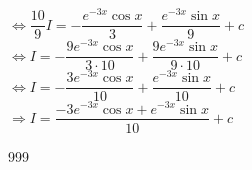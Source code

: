 \documentclass[a4paper]{article}
\begin{document}
$\Leftrightarrow \dfrac{10}{9}I = -\dfrac{e^{-3x} \cos x}{3} + \dfrac{e^{-3x} \sin x}{9} + c$ \\

$\Leftrightarrow I = -\dfrac{9e^{-3x} \cos x}{3\cdot10} + \dfrac{9e^{-3x} \sin x}{9\cdot10} + c$ \\

$\Leftrightarrow I = -\dfrac{3e^{-3x} \cos x}{10} + \dfrac{e^{-3x} \sin x}{10} + c$ \\

$\Rightarrow I = \dfrac{-3e^{-3x}\cos x + e^{-3x}\sin x}{10} + c$



\begin{thebibliography}{999}
\end{thebibliography}
\end{document}
